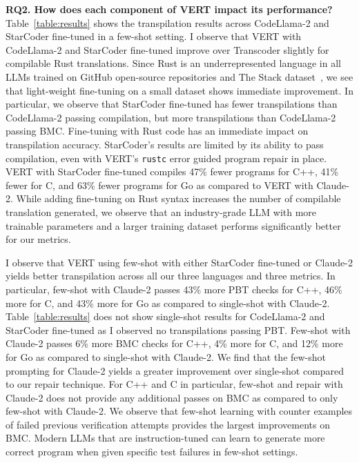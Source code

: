 \documentclass[12pt,openany,oneside,table]{cmuthesis}
\begin{document}
\noindent\textbf{RQ2. How does each component of VERT impact its performance?}
Table~\ref{table:results} shows the transpilation results across CodeLlama-2 and StarCoder fine-tuned in a few-shot setting.
I observe that VERT with CodeLlama-2 and StarCoder fine-tuned improve over Transcoder slightly for compilable Rust translations. Since Rust is an underrepresented language in all LLMs trained on GitHub open-source repositories and The Stack dataset~\cite{kocetkov2022stack}, we see that light-weight fine-tuning on a small dataset shows immediate improvement. In particular, we observe that StarCoder fine-tuned has fewer transpilations than CodeLlama-2 passing compilation, but more transpilations than CodeLlama-2 passing BMC. Fine-tuning with Rust code has an immediate impact on transpilation accuracy. 
StarCoder's results are limited by its ability to pass compilation, even with VERT's \texttt{rustc} error guided program repair in place. VERT with StarCoder fine-tuned compiles 47\% fewer programs for C++, 41\% fewer for C, and 63\% fewer programs for Go as compared to VERT with Claude-2. While adding fine-tuning on Rust syntax increases the number of compilable translation generated, we observe that an industry-grade LLM with more trainable parameters and a larger training dataset performs significantly better for our metrics.

I observe that VERT using few-shot with either StarCoder fine-tuned or Claude-2 yields better transpilation across all our three languages and three metrics. In particular, few-shot with Claude-2 passes 43\% more PBT checks for C++, 46\% more for C, and 43\% more for Go as compared to single-shot with Claude-2. Table~\ref{table:results} does not show single-shot results for CodeLlama-2 and StarCoder fine-tuned as I observed no transpilations passing PBT. Few-shot with Claude-2 passes 6\% more BMC checks for C++, 4\% more for C, and 12\% more for Go as compared to single-shot with Claude-2. We find that the few-shot prompting for Claude-2 yields a greater improvement over single-shot compared to our repair technique. For C++ and C in particular, few-shot and repair with Claude-2 does not provide any additional passes on BMC as compared to only few-shot with Claude-2. We observe that few-shot learning with counter examples of failed previous verification attempts provides the largest improvements on BMC. Modern LLMs that are instruction-tuned can learn to generate more correct program when given specific test failures in few-shot settings.
\end{document}
